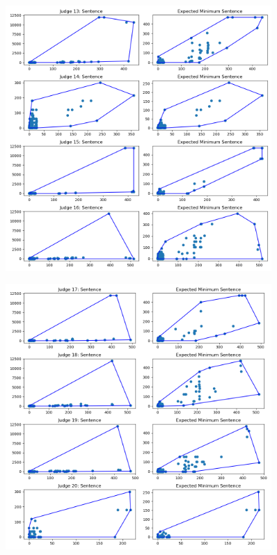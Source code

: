 \documentclass[11pt]{article}
\begin{document}
  \begin{figure}[H]
    \centering
    \includegraphics[width=0.9\textwidth]{../../../output/figures/Exploration/judge_convex_hulls_3.png}
  \end{figure}

  \begin{figure}[H]
    \centering
    \includegraphics[width=0.9\textwidth]{../../../output/figures/Exploration/judge_convex_hulls_4.png}
  \end{figure}
\end{document}
